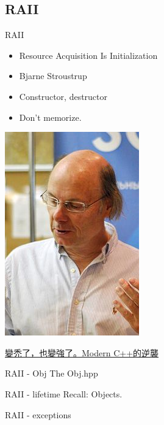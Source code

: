 \documentclass{beamer}
\begin{document}
\begin{CJK*}{UTF8}{bsmi}
    \subsection{RAII}
    \begin{frame}{RAII}
        \begin{multicols*}{2}
            \begin{itemize}
                \item Resource Acquisition Is Initialization
                \item Bjarne Stroustrup
                \item Constructor, destructor
                \item Don't memorize.
            \end{itemize}
            \includegraphics[height=.6\textheight]{Bjarne.jpg}
        \end{multicols*}
        \href{https://pretalx.com/coscup-2021/talk/review/WAJ7MELUXRJEG9US3AZNNMKRZTLWEL73}
        {變禿了，也變強了。Modern C++的逆襲}
    \end{frame}

    \begin{frame}{RAII - Obj}
        The Obj.hpp
        
    \end{frame}

    \begin{frame}{RAII - lifetime}
        Recall: Objects.\\
        
    \end{frame}

    \begin{frame}{RAII - exceptions}
        
    \end{frame}


\end{CJK*}
\end{document}
